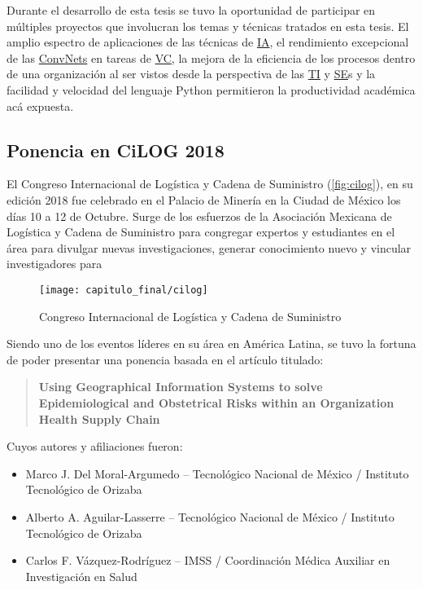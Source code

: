 Durante el desarrollo de esta tesis se tuvo la oportunidad de participar en
múltiples proyectos que involucran los temas y técnicas tratados en esta tesis.
El amplio espectro de aplicaciones de las técnicas de \hyperlink{abbr}{IA}, el
rendimiento excepcional de las \hyperlink{abbr}{ConvNets} en tareas de
\hyperlink{abbr}{VC}, la mejora de la eficiencia de los procesos dentro de una
organización al ser vistos desde la perspectiva de las \hyperlink{abbr}{TI} y
\hyperlink{abbr}{SE}s y la facilidad y velocidad del lenguaje Python permitieron
la productividad académica acá expuesta.
 
\subsection{Ponencia en CiLOG 2018}

El Congreso Internacional de Logística y Cadena de Suministro
(\autoref{fig:cilog}), en su edición 2018 fue celebrado en el Palacio de Minería
en la Ciudad de México los días 10 a 12 de Octubre. Surge de los esfuerzos de la
Asociación Mexicana de Logística y Cadena de Suministro para congregar expertos
y estudiantes en el área para divulgar nuevas investigaciones, generar
conocimiento nuevo y vincular investigadores para 

\begin{figure}[H]
    \centering
    \texttt{[image: capitulo\_final/cilog]}
    \caption{Congreso Internacional de Logística y Cadena de Suministro}\label{fig:cilog}
\end{figure}

Siendo uno de los eventos líderes en su área en América Latina, se tuvo la
fortuna de poder presentar una ponencia basada en el artículo titulado:

\begin{quote}
\textbf{Using Geographical Information Systems to solve Epidemiological and
    Obstetrical Risks within an Organization Health Supply Chain}
\end{quote}

Cuyos autores y afiliaciones fueron:

\begin{itemize}
    \item Marco J. Del Moral-Argumedo -- Tecnológico Nacional de México /
    Instituto Tecnológico de Orizaba
    \item Alberto A. Aguilar-Lasserre -- Tecnológico Nacional de México /
    Instituto Tecnológico de Orizaba
    \item Carlos F. Vázquez-Rodríguez -- IMSS / Coordinación Médica Auxiliar en
    Investigación en Salud
\end{itemize}


